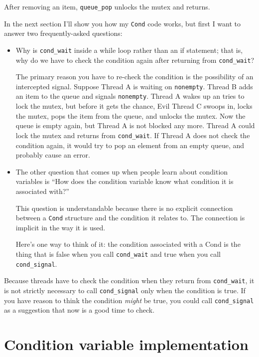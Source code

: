 \documentclass[12pt]{book}
\begin{document}
{After removing an item, \verb"queue_pop" unlocks the mutex
and returns.

In the next section I'll show you how my {\tt Cond} code works, but first I
want to answer two frequently-asked questions:

\begin{itemize}

\item Why is \verb"cond_wait" inside a while loop rather than an if
statement; that is, why do we have to check the condition again after
returning from \verb"cond_wait"?

The primary reason you have to re-check the condition is the possibility
of an intercepted signal.  Suppose Thread A is waiting on {\tt nonempty}.
Thread B adds an item to the queue and signals {\tt nonempty}.  Thread
A wakes up an tries to lock the mutex, but before it gets the chance,
Evil Thread C swoops in, locks the mutex, pops the item from the
queue, and unlocks the mutex.  Now the queue is empty again, but
Thread A is not blocked any more.  Thread A could lock the mutex and
returns from \verb"cond_wait".  If Thread A does not check the condition
again, it would try to pop an element from an empty queue, and probably
cause an error.

\item The other question that comes up when people learn about condition
variables is ``How does the condition variable know what condition it
is associated with?''

This question is understandable because there is no explicit connection
between a {\tt Cond} structure and the condition it relates to.  The
connection is implicit in the way it is used.

Here's one way to think of it: the condition associated with a Cond
is the thing that is false when you call \verb"cond_wait" and true
when you call \verb"cond_signal".

\end{itemize}

Because threads have to check the condition when they return from
\verb"cond_wait", it is not strictly necessary to call \verb"cond_signal"
only when the condition is true.  If you have reason to think the
condition {\em might} be true, you could call \verb"cond_signal" as
a suggestion that now is a good time to check.


\section{Condition variable implementation}

}
\end{document}
